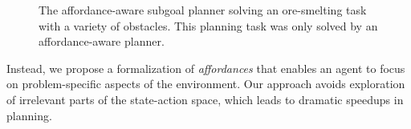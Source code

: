 \documentclass[]{article}
\begin{document}
      
      \begin{figure}
\centering
%
%
%
%
  \caption{The affordance-aware subgoal planner solving an ore-smelting task with a variety of obstacles. This planning task was
  only solved by an affordance-aware planner.}
  \label{fig:epicworld}
\end{figure}


Instead, we propose a formalization of {\em affordances} \citep{gibson77} that enables an agent to focus on
problem-specific aspects of the environment. Our approach avoids exploration of irrelevant parts of the 
state-action space, which leads to dramatic speedups in planning.
\end{document}
